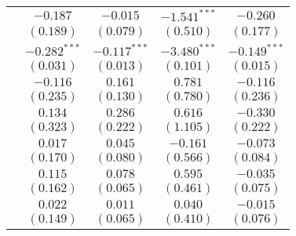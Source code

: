 \begin{table}
\begin{center}
\begin{tabular}{l c c c c}
                                                 & $-0.187$                     & $-0.015$       & $-1.541^{***}$                & $-0.260$       \\
                                                 & $(0.189)$                    & $(0.079)$      & $(0.510)$                     & $(0.177)$      \\
                                                 & $-0.282^{***}$               & $-0.117^{***}$ & $-3.480^{***}$                & $-0.149^{***}$ \\
                                                 & $(0.031)$                    & $(0.013)$      & $(0.101)$                     & $(0.015)$      \\
                                                 & $-0.116$                     & $0.161$        & $0.781$                       & $-0.116$       \\
                                                 & $(0.235)$                    & $(0.130)$      & $(0.780)$                     & $(0.236)$      \\
                                                 & $0.134$                      & $0.286$        & $0.616$                       & $-0.330$       \\
                                                 & $(0.323)$                    & $(0.222)$      & $(1.105)$                     & $(0.222)$      \\
                                                 & $0.017$                      & $0.045$        & $-0.161$                      & $-0.073$       \\
                                                 & $(0.170)$                    & $(0.080)$      & $(0.566)$                     & $(0.084)$      \\
                                                 & $0.115$                      & $0.078$        & $0.595$                       & $-0.035$       \\
                                                 & $(0.162)$                    & $(0.065)$      & $(0.461)$                     & $(0.075)$      \\
                                                 & $0.022$                      & $0.011$        & $0.040$                       & $-0.015$       \\
                                                 & $(0.149)$                    & $(0.065)$      & $(0.410)$                     & $(0.076)$      \\

\end{tabular}
\end{center}
\end{table}

